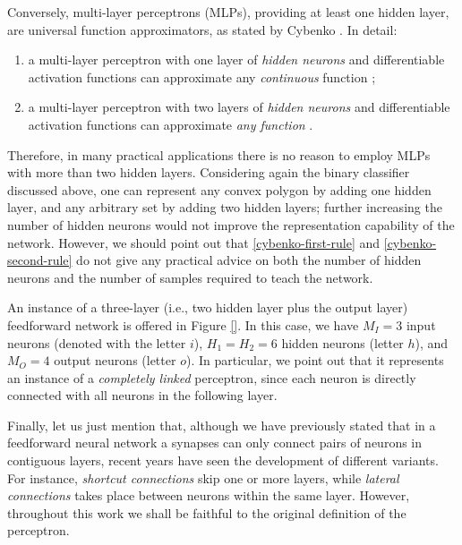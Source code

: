 \documentclass[12pt, a4paper, twoside, openright]{report}
\numberwithin{equation}{chapter}
\theoremstyle{theorem}
\theoremstyle{definition}
\theoremstyle{remark}
\theoremstyle{proposition}
\numberwithin{figure}{chapter}
\begin{document}
		Conversely, multi-layer perceptrons (MLPs), providing at least one hidden layer, are universal function approximators, as stated by Cybenko \cite{Cyb88, Cyb89}. In detail:
		\begin{enumerate}[label=(\roman*)]
			\item a multi-layer perceptron with one layer of \emph{hidden neurons} and differentiable activation functions can approximate any \emph{continuous} function \cite{Cyb89};
			\label{cybenko-first-rule}
			\item a multi-layer perceptron with two layers of \emph{hidden neurons} and differentiable activation functions can approximate \emph{any function} \cite{Cyb88}.
			\label{cybenko-second-rule}
		\end{enumerate}
		Therefore, in many practical applications there is no reason to employ MLPs with more than two hidden layers. Considering again the binary classifier discussed above, one can represent any convex polygon by adding one hidden layer, and any arbitrary set by adding two hidden layers; further increasing the number of hidden neurons would not improve the representation capability of the network. However, we should point out that \ref{cybenko-first-rule} and \ref{cybenko-second-rule} do not give any practical advice on both the number of hidden neurons and the number of samples required to teach the network.
		
		An instance of a three-layer (i.e., two hidden layer plus the output layer) feedforward network is offered in Figure \ref{}. In this case, we have $M_I = 3$ input neurons (denoted with the letter $i$), $H_1 = H_2 = 6$ hidden neurons (letter $h$), and $M_O = 4$ output neurons (letter $o$). In particular, we point out that it represents an instance of a \emph{completely linked} perceptron, since each neuron is directly connected with all neurons in the following layer.
		
		Finally, let us just mention that, although we have previously stated that in a feedforward neural network a synapses can only connect pairs of neurons in contiguous layers, recent years have seen the development of different variants. For instance, \emph{shortcut connections} skip one or more layers, while \emph{lateral connections} takes place between neurons within the same layer. However, throughout this work we shall be faithful to the original definition of the perceptron.
				
		\vspace*{0.3cm}
		
\end{document}
